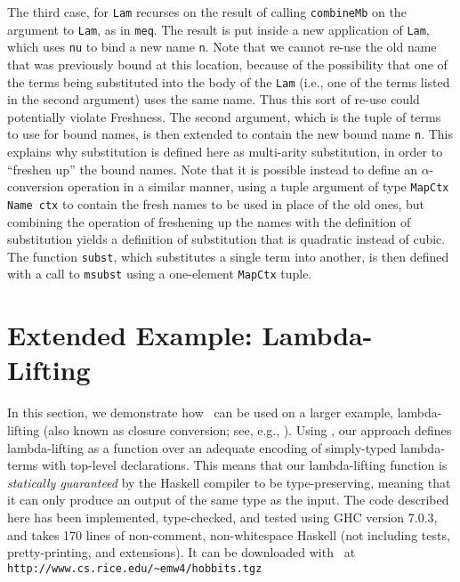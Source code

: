 \documentclass[natbib]{sigplanconf}
\begin{document}
The third case, for \lstinline{Lam} recurses on the result of calling
\lstinline{combineMb} on the argument to \lstinline{Lam}, as in
\lstinline{meq}. The result is put inside a new application of
\lstinline{Lam}, which uses \lstinline{nu} to bind a new name
\lstinline{n}. Note that we cannot re-use the old name that was
previously bound at this location, because of the possibility that one
of the terms being substituted into the body of the \lstinline{Lam}
(i.e., one of the terms listed in the second argument) uses the same
name. Thus this sort of re-use could potentially violate
Freshness. The second argument, which is the tuple of terms to use for
bound names, is then extended to contain the new bound name
\lstinline{n}. This explains why substitution is defined here as
multi-arity substitution, in order to ``freshen up'' the bound names.
Note that it is possible instead to define an $\alpha$-conversion
operation in a similar manner, using a tuple argument of type
\lstinline{MapCtx Name ctx} to contain the fresh names to be used in
place of the old ones, but combining the operation of freshening up
the names with the definition of substitution yields a definition of
substitution that is quadratic instead of cubic.  The function
\lstinline{subst}, which substitutes a single term into another, is
then defined with a call to \lstinline{msubst} using a one-element
\lstinline{MapCtx} tuple.


\section{Extended Example: Lambda-Lifting}
\label{sec:lambda-lifting}

In this section, we demonstrate how \ourlib\ can be used on a larger
example, lambda-lifting (also known as closure conversion; see, e.g.,
\cite{peyton-jones87}). Using \ourlib, our approach defines
lambda-lifting as a function over an adequate encoding of simply-typed
lambda-terms with top-level declarations. This means that our
lambda-lifting function is \emph{statically guaranteed} by the Haskell
compiler to be type-preserving, meaning that it can only produce an
output of the same type as the input. The code described here has been
implemented, type-checked, and tested using GHC version 7.0.3, and
takes 170 lines of non-comment, non-whitespace Haskell (not including
tests, pretty-printing, and extensions). It can be downloaded with
\ourlib\ at \lstinline{http://www.cs.rice.edu/~emw4/hobbits.tgz}
\end{document}
